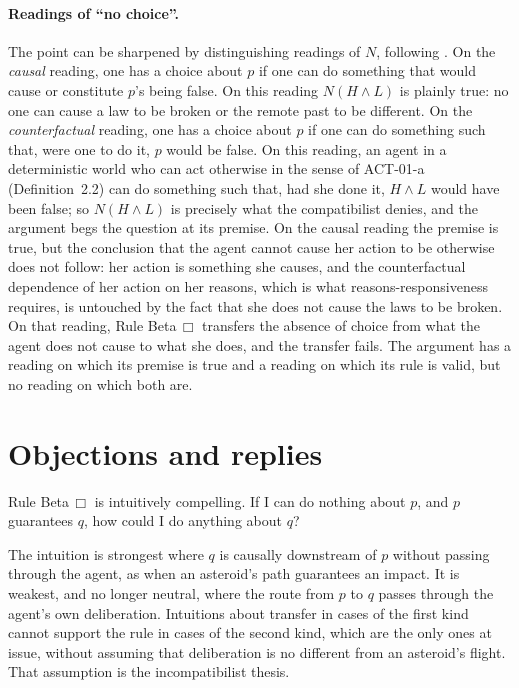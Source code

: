 \documentclass{situationist-preprint}
\begin{document}
\paragraph{Readings of \enquote{no choice}.} The point can be sharpened by distinguishing readings of $N$, following \citet{Lewis1981}. On the \emph{causal} reading, one has a choice about $p$ if one can do something that would cause or constitute $p$'s being false. On this reading $N(H \wedge L)$ is plainly true: no one can cause a law to be broken or the remote past to be different. On the \emph{counterfactual} reading, one has a choice about $p$ if one can do something such that, were one to do it, $p$ would be false. On this reading, an agent in a deterministic world who can act otherwise in the sense of ACT-01-a (Definition~2.2) can do something such that, had she done it, $H \wedge L$ would have been false; so $N(H \wedge L)$ is precisely what the compatibilist denies, and the argument begs the question at its premise. On the causal reading the premise is true, but the conclusion that the agent cannot cause her action to be otherwise does not follow: her action is something she causes, and the counterfactual dependence of her action on her reasons, which is what reasons-responsiveness requires, is untouched by the fact that she does not cause the laws to be broken. On that reading, Rule Beta$\,\Box$ transfers the absence of choice from what the agent does not cause to what she does, and the transfer fails. The argument has a reading on which its premise is true and a reading on which its rule is valid, but no reading on which both are.

\section{Objections and replies}

\begin{objection}
Rule Beta$\,\Box$ is intuitively compelling. If I can do nothing about $p$, and $p$ guarantees $q$, how could I do anything about $q$?
\end{objection}

\begin{reply}
The intuition is strongest where $q$ is causally downstream of $p$ without passing through the agent, as when an asteroid's path guarantees an impact. It is weakest, and no longer neutral, where the route from $p$ to $q$ passes through the agent's own deliberation. Intuitions about transfer in cases of the first kind cannot support the rule in cases of the second kind, which are the only ones at issue, without assuming that deliberation is no different from an asteroid's flight. That assumption is the incompatibilist thesis.
\end{reply}
\end{document}
